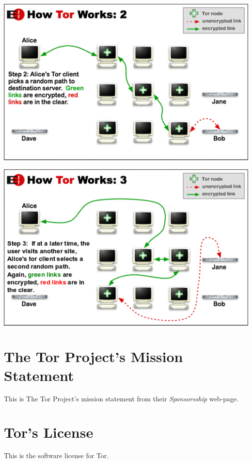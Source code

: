 \documentclass[11pt]{article}
\begin{document}
\begin{center}
\includegraphics[natwidth=510bp,natheight=326bp,width= 0.7\linewidth]{appendix/htw2.png}
\end{center}


\begin{center}
\includegraphics[natwidth=510bp,natheight=326bp,width= 0.7\linewidth]{appendix/htw3.png}
\end{center}

\section{The Tor Project's Mission Statement}
\label{Tor:MissionStatement}

This is The Tor Project's mission statement from their \textit{Sponsorsship}
web-page.\cite{TOR:Sponsorship}



\section{Tor's License}
This is the software license for Tor.\cite{TOR:BSD-License}
\label{Tor:License}



\newpage

\nocite{*}




\end{document}
